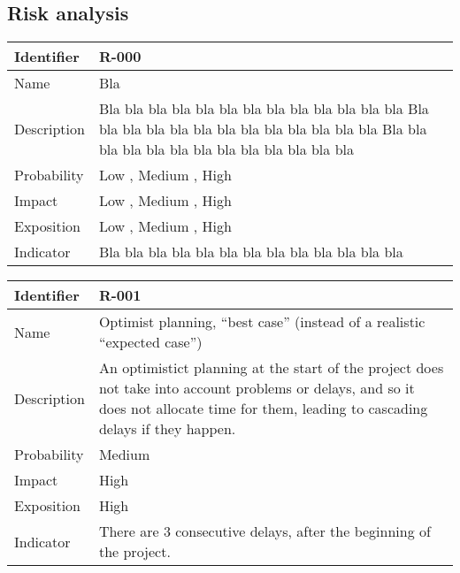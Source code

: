 \subsection{Risk analysis}


\begin{table}[H]
	\begin{tabularx}{\textwidth}{|l|X|}
		\hline
		\rowcolor{gray!30}
		Identifier & \textbf{R-000} \\ \hline
		Name & Bla \\ \hline
		Description & Bla bla bla bla bla bla bla bla bla bla bla bla bla Bla bla bla bla bla bla bla bla bla bla bla bla bla Bla bla bla bla bla bla bla bla bla bla bla bla bla \\ \hline
		Probability & Low , Medium , High \\ \hline
		Impact & Low , Medium , High \\ \hline
		Exposition & Low , Medium , High \\ \hline
		Indicator & Bla bla bla bla bla bla bla bla bla bla bla bla bla \\ \hline
	\end{tabularx}
\end{table}

\begin{table}[H]
	\begin{tabularx}{\textwidth}{|l|X|}
		\hline
		\rowcolor{gray!30}
		Identifier & \textbf{R-001} \\ \hline
		Name & Optimist planning, ``best case'' (instead of a realistic ``expected case'')\\ \hline
		Description & An optimistict planning at the start of the project does not take into account problems or delays, and so it does not allocate time for them, leading to cascading delays if they happen. \\ \hline
		Probability & Medium\\ \hline
		Impact &  High\\ \hline
		Exposition &  High\\ \hline
		Indicator & There are 3 consecutive delays, after the beginning of the project.\\ \hline
	\end{tabularx}
\end{table}



